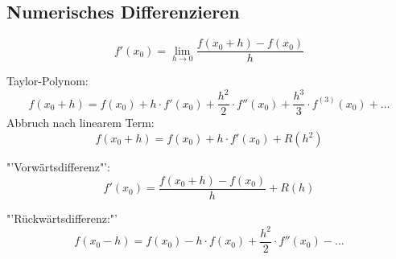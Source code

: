 \subsection{Numerisches Differenzieren}

\begin{equation}
	f'(x_0) = \lim\limits_{h\rightarrow 0} \frac{f(x_0 + h) - f(x_0)}{h}
\end{equation}

Taylor-Polynom: \[ f(x_0 + h) = f(x_0) + h\cdot f'(x_0) + \frac{h^2}{2} \cdot f''(x_0) + \frac{h^3}{3}\cdot f^{(3)}(x_0) + \ldots\]
Abbruch nach linearem Term: \[f(x_0+h) = f(x_0) + h\cdot f'(x_0) + R(h^2)\]

"'Vorwärtsdifferenz"':
\begin{equation}
	f'(x_0) = \frac{f(x_0 + h) - f(x_0)}{h} + R(h)
\end{equation}

"'Rückwärtsdifferenz:"'
\begin{equation}
	f(x_0 - h) = f(x_0) - h \cdot f(x_0) + \frac{h^2}{2} \cdot f''(x_0) - \ldots
\end{equation}